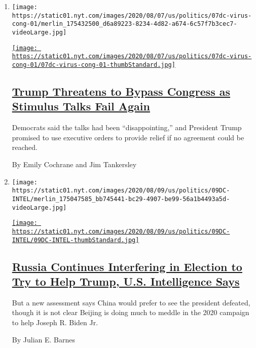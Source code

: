 \begin{enumerate}
\def\labelenumi{\arabic{enumi}.}
\item
  \texttt{[image: https://static01.nyt.com/images/2020/08/07/us/politics/07dc-virus-cong-01/merlin\_175432500\_d6a89223-8234-4d82-a674-6c57f7b3cec7-videoLarge.jpg]}

  \href{/2020/08/07/us/politics/trump-congress-stimulus.html}{\texttt{[image: https://static01.nyt.com/images/2020/08/07/us/politics/07dc-virus-cong-01/07dc-virus-cong-01-thumbStandard.jpg]}}

  \hypertarget{trump-threatens-to-bypass-congress-as-stimulus-talks-fail-again}{%
  \subsection{\texorpdfstring{\href{/2020/08/07/us/politics/trump-congress-stimulus.html}{Trump
  Threatens to Bypass Congress as Stimulus Talks Fail
  Again}}{Trump Threatens to Bypass Congress as Stimulus Talks Fail Again}}\label{trump-threatens-to-bypass-congress-as-stimulus-talks-fail-again}}

  Democrats said the talks had been ``disappointing,'' and President
  Trump promised to use executive orders to provide relief if no
  agreement could be reached.

  By Emily Cochrane and Jim Tankersley
\item
  \texttt{[image: https://static01.nyt.com/images/2020/08/09/us/politics/09DC-INTEL/merlin\_175047585\_bb745441-bc29-4907-be99-56a1b4493a5d-videoLarge.jpg]}

  \href{/2020/08/07/us/politics/russia-china-trump-biden-election-interference.html}{\texttt{[image: https://static01.nyt.com/images/2020/08/09/us/politics/09DC-INTEL/09DC-INTEL-thumbStandard.jpg]}}

  \hypertarget{russia-continues-interfering-in-election-to-try-to-help-trump-us-intelligence-says}{%
  \subsection{\texorpdfstring{\href{/2020/08/07/us/politics/russia-china-trump-biden-election-interference.html}{Russia
  Continues Interfering in Election to Try to Help Trump, U.S.
  Intelligence
  Says}}{Russia Continues Interfering in Election to Try to Help Trump, U.S. Intelligence Says}}\label{russia-continues-interfering-in-election-to-try-to-help-trump-us-intelligence-says}}

  But a new assessment says China would prefer to see the president
  defeated, though it is not clear Beijing is doing much to meddle in
  the 2020 campaign to help Joseph R. Biden Jr.

  By Julian E. Barnes
\end{enumerate}

